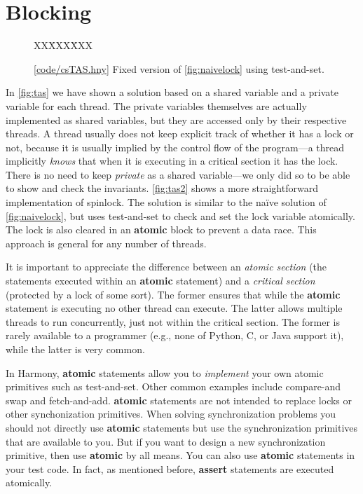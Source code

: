 \documentclass{report}
\newcommand{\harmonysource}[1]{
\begin{tabbing}
XX\=XXX\=XXX\kill
    
\end{tabbing}
}
\newcommand{\harmonylink}[1]{%
[\href{https://harmony.cs.cornell.edu/#1}{\underline{#1}}]%
}
\newenvironment{code}{
\tcolorbox
}{
\endtcolorbox
}
\begin{document}
\chapter{Blocking}
\label{ch:synch}
%
%

\begin{figure}
\begin{code}
\harmonysource{csTAS}
\end{code}
\caption{\harmonylink{code/csTAS.hny} Fixed version of \autoref{fig:naivelock} using test-and-set.}
\label{fig:tas2}
\end{figure}

In \autoref{fig:tas} we have shown a solution based on a shared
variable and a private variable for each thread.   The private
variables themselves are actually implemented as shared variables,
but they are accessed only by their respective threads.
A thread usually does not keep explicit track of whether it has a lock
or not, because it is usually implied by the control flow of the program---a
thread implicitly \emph{knows} that when it is executing in a critical
section it has the lock.
There is no need to keep \textit{private} as a shared
variable---we only did so to be able to show and check the invariants.
\autoref{fig:tas2} shows a more straightforward implementation of spinlock.
The solution is similar to the na\"{i}ve solution of \autoref{fig:naivelock},
but uses test-and-set to check and set the lock variable atomically.
The lock is also cleared in an \textbf{atomic} block to prevent a data race.
This approach is general for any number of threads.

It is important to appreciate the difference between an
\emph{atomic section} (the statements executed within an
\textbf{atomic} statement) and a \emph{critical section}
(protected by a lock of some sort).
The former ensures that while the
\textbf{atomic} statement is executing no other thread can execute.
The latter allows multiple threads to run concurrently,
just not within the critical section.
The former is rarely available to a programmer (e.g., none of
Python, C, or Java support it), while the latter
is very common.

In Harmony, \textbf{atomic} statements allow you to \emph{implement} your own
atomic primitives such as test-and-set.  Other common examples
include compare-and swap and fetch-and-add.  \textbf{atomic} statements
are not intended to replace locks or other synchonization primitives.
When solving synchronization problems you should not directly use
\textbf{atomic} statements but use the synchronization primitives that are available
to you.  But if you want to design a new synchronization primitive, then
use \textbf{atomic} by all means.
You can also use \textbf{atomic} statements in your test code.
In fact, as mentioned before, \textbf{assert} statements are executed atomically.
\end{document}
